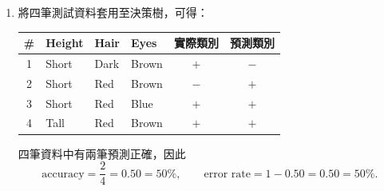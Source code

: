 \begin{enumerate}
  \item 將四筆測試資料套用至決策樹，可得：
  \begin{center}
  \begin{tabular}{clllcc}
    \toprule
    \# & Height & Hair & Eyes & 實際類別 & 預測類別 \\
    \midrule
    1 & Short & Dark & Brown & $+$ & $-$ \\
    2 & Short & Red  & Brown & $-$ & $+$ \\
    3 & Short & Red  & Blue  & $+$ & $+$ \\
    4 & Tall  & Red  & Brown & $+$ & $+$ \\
    \bottomrule
  \end{tabular}
  \end{center}
  四筆資料中有兩筆預測正確，因此
  \[
    \text{accuracy}=\frac24=0.50=50\%,\qquad
    \text{error rate}=1-0.50=0.50=50\%.
  \]
\end{enumerate}

\clearpage
